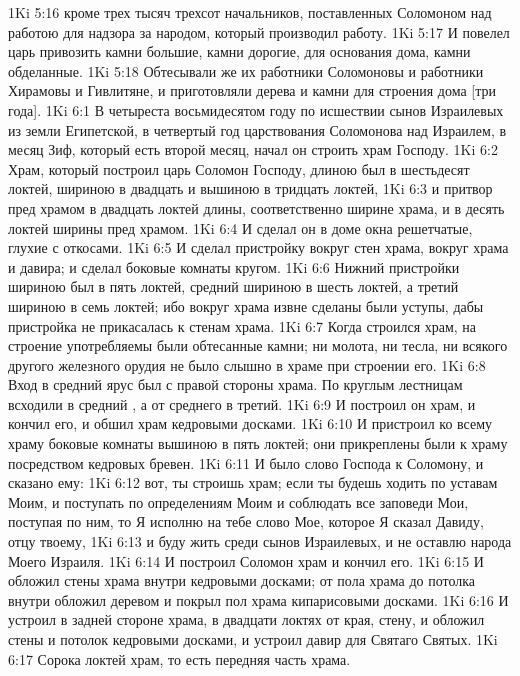 \vs 1Ki 5:16 кроме трех тысяч трехсот начальников, поставленных Соломоном над работою для надзора за народом, который производил работу.
\vs 1Ki 5:17 И повелел царь привозить камни большие, камни дорогие, для основания дома, камни обделанные.
\vs 1Ki 5:18 Обтесывали же их работники Соломоновы и работники Хирамовы и Гивлитяне, и приготовляли дерева и камни для строения дома [три года].
\vs 1Ki 6:1 В четыреста восьмидесятом году по исшествии сынов Израилевых из земли Египетской, в четвертый год царствования Соломонова над Израилем, в месяц Зиф, который есть второй месяц, начал он строить храм Господу.
\vs 1Ki 6:2 Храм, который построил царь Соломон Господу, длиною был в шестьдесят локтей, шириною в двадцать и вышиною в тридцать локтей,
\vs 1Ki 6:3 и притвор пред храмом в двадцать локтей длины, соответственно ширине храма, и в десять локтей ширины пред храмом.
\vs 1Ki 6:4 И сделал он в доме окна решетчатые, глухие с откосами.
\vs 1Ki 6:5 И сделал пристройку вокруг стен храма, вокруг храма и давира; и сделал боковые комнаты кругом.
\vs 1Ki 6:6 Нижний  пристройки шириною был в пять локтей, средний шириною в шесть локтей, а третий шириною в семь локтей; ибо вокруг храма извне сделаны были уступы, дабы пристройка не прикасалась к стенам храма.
\vs 1Ki 6:7 Когда строился храм, на строение употребляемы были обтесанные камни; ни молота, ни тесла, ни всякого другого железного орудия не было слышно в храме при строении его.
\vs 1Ki 6:8 Вход в средний ярус был с правой стороны храма. По круглым лестницам всходили в средний , а от среднего в третий.
\vs 1Ki 6:9 И построил он храм, и кончил его, и обшил храм кедровыми досками.
\vs 1Ki 6:10 И пристроил ко всему храму боковые комнаты вышиною в пять локтей; они прикреплены были к храму посредством кедровых бревен.
\rsbpar\vs 1Ki 6:11 И было слово Господа к Соломону, и сказано ему:
\vs 1Ki 6:12 вот, ты строишь храм; если ты будешь ходить по уставам Моим, и поступать по определениям Моим и соблюдать все заповеди Мои, поступая по ним, то Я исполню на тебе слово Мое, которое Я сказал Давиду, отцу твоему,
\vs 1Ki 6:13 и буду жить среди сынов Израилевых, и не оставлю народа Моего Израиля.
\rsbpar\vs 1Ki 6:14 И построил Соломон храм и кончил его.
\vs 1Ki 6:15 И обложил стены храма внутри кедровыми досками; от пола храма до потолка внутри обложил деревом и покрыл пол храма кипарисовыми досками.
\vs 1Ki 6:16 И устроил в задней стороне храма, в двадцати локтях от края, стену, и обложил стены и потолок кедровыми досками, и устроил давир для Святаго Святых.
\vs 1Ki 6:17 Сорока локтей  храм, то есть передняя часть храма.
